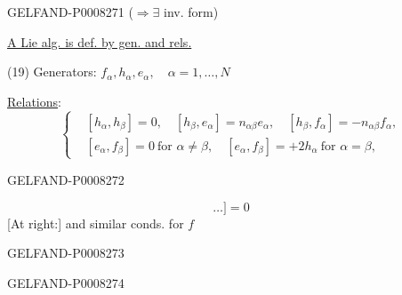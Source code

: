 \begin{GelfandAdjacentEvidence}{GELFAND-P000827}{1}
(\(\Rightarrow\exists\) inv. form)

\uline{A Lie alg. is def. by gen. and rels.}

(19) Generators: \(f_\alpha,h_\alpha,e_\alpha,\quad\alpha=1,\ldots,N\)

\uline{Relations}:
\begin{equation*}
\left\{\begin{aligned}
 &[h_\alpha,h_\beta]=0,\quad
   [h_\beta,e_\alpha]=n_{\alpha\beta}e_\alpha,\quad
   [h_\beta,f_\alpha]=-n_{\alpha\beta}f_\alpha,\\
 &[e_\alpha,f_\beta]=0\ \text{for }\alpha\ne\beta,\quad
   [e_\alpha,f_\beta]=+2h_\alpha\ \text{for }\alpha=\beta,
\end{aligned}\right.\tag{20}
\end{equation*}
\end{GelfandAdjacentEvidence}
\begin{GelfandAdjacentEvidence}{GELFAND-P000827}{2}


\begin{equation*}
[\underbrace{e_\alpha\ldots e_\alpha[e_\alpha}_{-n_{\alpha\beta}+1\ \text{times}},e_\beta]\ldots]=0
\tag*{\((20)'\)}
\end{equation*}
[At right:] and similar conds. for \(f\)
\end{GelfandAdjacentEvidence}
\begin{GelfandAdjacentEvidence}{GELFAND-P000827}{3}


\end{GelfandAdjacentEvidence}
\begin{GelfandAdjacentEvidence}{GELFAND-P000827}{4}


\end{GelfandAdjacentEvidence}
